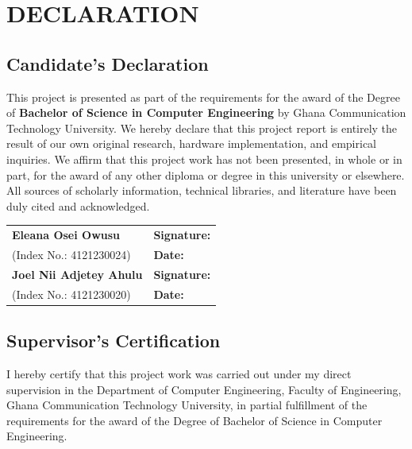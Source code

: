 \chapter*{DECLARATION}

\section*{Candidate's Declaration}
This project is presented as part of the requirements for the award of the Degree of \textbf{Bachelor of Science in Computer Engineering} by Ghana Communication Technology University. We hereby declare that this project report is entirely the result of our own original research, hardware implementation, and empirical inquiries. We affirm that this project work has not been presented, in whole or in part, for the award of any other diploma or degree in this university or elsewhere. All sources of scholarly information, technical libraries, and literature have been duly cited and acknowledged.

\vspace{1.5cm}

\noindent
\begin{tabular}{p{7.5cm}p{7.5cm}}
\textbf{Eleana Osei Owusu} & \textbf{Signature:} \hrulefill \\[0.2cm]
(Index No.: 4121230024) & \textbf{Date:} \hrulefill \\[1.2cm]
\textbf{Joel Nii Adjetey Ahulu} & \textbf{Signature:} \hrulefill \\[0.2cm]
(Index No.: 4121230020) & \textbf{Date:} \hrulefill \\
\end{tabular}

\vspace{2.0cm}

\section*{Supervisor's Certification}
I hereby certify that this project work was carried out under my direct supervision in the Department of Computer Engineering, Faculty of Engineering, Ghana Communication Technology University, in partial fulfillment of the requirements for the award of the Degree of Bachelor of Science in Computer Engineering.

